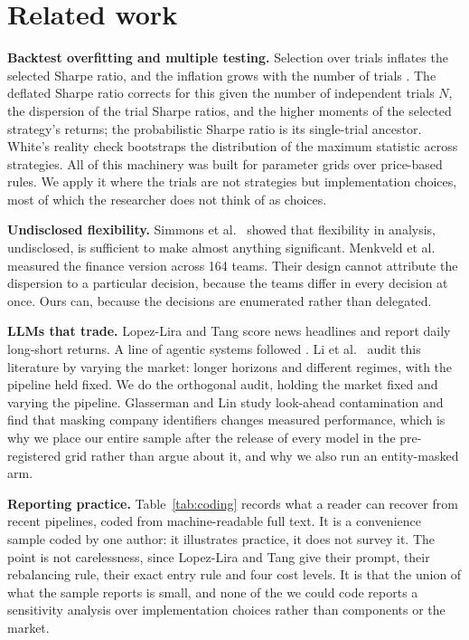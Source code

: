 \documentclass[sigconf]{acmart}
\begin{document}
\section{Related work}

\textbf{Backtest overfitting and multiple testing.} Selection over trials inflates the selected
Sharpe ratio, and the inflation grows with the number of trials \cite{bailey2014pseudo}. The
deflated Sharpe ratio \cite{bailey2014deflated} corrects for this given the number of independent
trials $N$, the dispersion of the trial Sharpe ratios, and the higher moments of the selected
strategy's returns; the probabilistic Sharpe ratio \cite{bailey2012sharpe} is its single-trial
ancestor. White's reality check \cite{white2000reality} bootstraps the distribution of the maximum
statistic across strategies. All of this machinery was built for parameter grids over price-based
rules. We apply it where the trials are not strategies but implementation choices, most of which the
researcher does not think of as choices.

\textbf{Undisclosed flexibility.} Simmons et al.~\cite{simmons2011false} showed that flexibility in
analysis, undisclosed, is sufficient to make almost anything significant. Menkveld
et al.~\cite{menkveld2024nonstandard} measured the finance version across 164 teams. Their design
cannot attribute the dispersion to a particular decision, because the teams differ in every decision
at once. Ours can, because the decisions are enumerated rather than delegated.

\textbf{LLMs that trade.} Lopez-Lira and Tang \cite{lopezlira2023chatgpt} score news headlines and
report daily long-short returns. A line of agentic systems followed
\cite{yu2023finmem,zhang2024finagent,yu2024fincon,xiao2024tradingagents,papadakis2025atlas}. Li
et al.~\cite{li2025finsaber} audit this literature by varying the market: longer horizons and
different regimes, with the pipeline held fixed. We do the orthogonal audit, holding the market
fixed and varying the pipeline. Glasserman and Lin \cite{glasserman2023assessing} study look-ahead
contamination and find that masking company identifiers changes measured performance, which is why
we place our entire sample after the release of every model in the pre-registered grid rather than
argue about it, and why we also run an entity-masked arm.

\textbf{Reporting practice.} Table~\ref{tab:coding} records what a reader can recover from
\NumCodedTotal{} recent pipelines, \NumCoded{} coded from machine-readable full text. It is a
convenience sample coded by one author: it illustrates practice, it does not survey it. The point is
not carelessness, since Lopez-Lira and Tang \cite{lopezlira2023chatgpt} give their prompt, their rebalancing
rule, their exact entry rule and four cost levels. It is that the union of what the sample reports is small, and none
of the \NumCoded{} we could code reports a sensitivity analysis over implementation choices rather
than components or the market.
\end{document}
